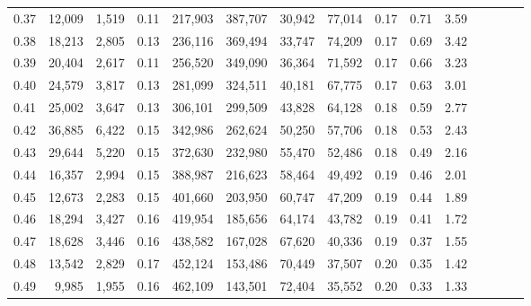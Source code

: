 \begin{tabular}{rrrcrrrrrrrrrrr}
0.37 &  12,009 &  1,519 &                                       0.11 &  217,903 &  387,707 &   30,942 &   77,014 &  0.17 &  0.71 &                         3.59 \\
0.38 &  18,213 &  2,805 &                                       0.13 &  236,116 &  369,494 &   33,747 &   74,209 &  0.17 &  0.69 &                         3.42 \\
0.39 &  20,404 &  2,617 &                                       0.11 &  256,520 &  349,090 &   36,364 &   71,592 &  0.17 &  0.66 &                         3.23 \\
0.40 &  24,579 &  3,817 &                                       0.13 &  281,099 &  324,511 &   40,181 &   67,775 &  0.17 &  0.63 &                         3.01 \\
0.41 &  25,002 &  3,647 &                                       0.13 &  306,101 &  299,509 &   43,828 &   64,128 &  0.18 &  0.59 &                         2.77 \\
0.42 &  36,885 &  6,422 &                                       0.15 &  342,986 &  262,624 &   50,250 &   57,706 &  0.18 &  0.53 &                         2.43 \\
0.43 &  29,644 &  5,220 &                                       0.15 &  372,630 &  232,980 &   55,470 &   52,486 &  0.18 &  0.49 &                         2.16 \\
0.44 &  16,357 &  2,994 &                                       0.15 &  388,987 &  216,623 &   58,464 &   49,492 &  0.19 &  0.46 &                         2.01 \\
0.45 &  12,673 &  2,283 &                                       0.15 &  401,660 &  203,950 &   60,747 &   47,209 &  0.19 &  0.44 &                         1.89 \\
0.46 &  18,294 &  3,427 &                                       0.16 &  419,954 &  185,656 &   64,174 &   43,782 &  0.19 &  0.41 &                         1.72 \\
0.47 &  18,628 &  3,446 &                                       0.16 &  438,582 &  167,028 &   67,620 &   40,336 &  0.19 &  0.37 &                         1.55 \\
0.48 &  13,542 &  2,829 &                                       0.17 &  452,124 &  153,486 &   70,449 &   37,507 &  0.20 &  0.35 &                         1.42 \\
0.49 &   9,985 &  1,955 &                                       0.16 &  462,109 &  143,501 &   72,404 &   35,552 &  0.20 &  0.33 &                         1.33 \\

\end{tabular}
